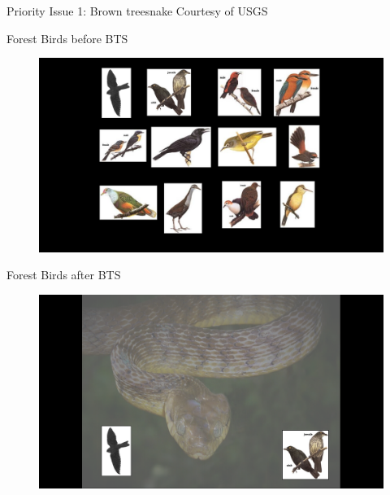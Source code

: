 \documentclass[]{beamer}
\begin{document}
\begin{frame}{Priority Issue 1: Brown treesnake}
	\tiny{Courtesy of USGS}
\end{frame}

\begin{frame}{Forest Birds before BTS}
	\begin{figure}
		\includegraphics[height=0.8\textheight]{images/birds-before-bts.png}
	\end{figure}
\end{frame}

\begin{frame}{Forest Birds after BTS}
	\begin{figure}
		\includegraphics[height=0.8\textheight]{images/birds-after-bts.png}
	\end{figure}
\end{frame}
\end{document}
